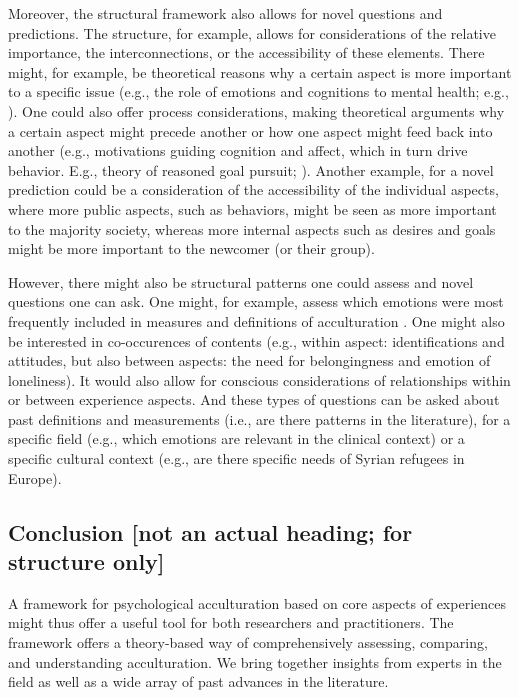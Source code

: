 \documentclass[man, 12pt, a4paper]{apa7}
\begin{document}
Moreover, the structural framework also allows for novel questions and predictions. The structure, for example, allows for considerations of the relative importance, the interconnections, or the accessibility of these elements. There might, for example, be theoretical reasons why a certain aspect is more important to a specific issue (e.g., the role of emotions and cognitions to mental health; e.g., \citealp{Crocker2013}). One could also offer process considerations, making theoretical arguments why a certain aspect might precede another or how one aspect might feed back into another (e.g., motivations guiding cognition and affect, which in turn drive behavior. E.g., theory of reasoned goal pursuit; \citealp{Ajzen2019}). Another example, for a novel prediction could be a consideration of the accessibility of the individual aspects, where more public aspects, such as behaviors, might be seen as more important to the majority society, whereas more internal aspects such as desires and goals might be more important to the newcomer (or their group).

However, there might also be structural patterns one could assess and novel questions one can ask. One might, for example, assess which emotions were most frequently included in measures and definitions of acculturation \citep[e.g., specific emotions such as anger or pride, but also types of emotions, such as positive or negative, or about yourself or others;][]{DeLeersnyder2017}. One might also be interested in co-occurences of contents (e.g., within aspect: identifications and attitudes, but also between aspects: the need for belongingness and emotion of loneliness). It would also allow for conscious considerations of relationships within or between experience aspects. And these types of questions can be asked about past definitions and measurements (i.e., are there patterns in the literature), for a specific field (e.g., which emotions are relevant in the clinical context) or a specific cultural context (e.g., are there specific needs of Syrian refugees in Europe). 

\subsection{Conclusion [not an actual heading; for structure only]}
A framework for psychological acculturation based on core aspects of experiences might thus offer a useful tool for both researchers and practitioners. The framework offers a theory-based way of comprehensively assessing, comparing, and understanding acculturation. We bring together insights from experts in the field as well as a wide array of past advances in the literature.
\end{document}
